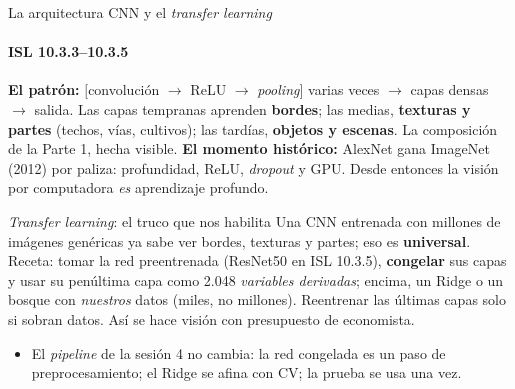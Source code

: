 \documentclass{beamer}
\newcommand{\1}{\mathbb{I}}
\begin{document}
\begin{frame}{La arquitectura CNN y el \emph{transfer learning}}
\framesubtitle{ISL 10.3.3--10.3.5}
\small
\textbf{El patrón:} $\big[$convolución $\rightarrow$ ReLU $\rightarrow$ \emph{pooling}$\big]$ varias veces $\rightarrow$ capas densas $\rightarrow$ salida. Las capas tempranas aprenden \textbf{bordes}; las medias, \textbf{texturas y partes} (techos, vías, cultivos); las tardías, \textbf{objetos y escenas}. La composición de la Parte 1, hecha visible.
\pause
\vspace{0.05cm}
\textbf{El momento histórico:} AlexNet gana ImageNet (2012) por paliza: profundidad, ReLU, \emph{dropout} y GPU. Desde entonces la visión por computadora \emph{es} aprendizaje profundo.
\pause
\vspace{0.05cm}
\begin{block}{\emph{Transfer learning}: el truco que nos habilita}
Una CNN entrenada con millones de imágenes genéricas ya sabe ver bordes, texturas y partes; eso es \textbf{universal}. Receta: tomar la red preentrenada (ResNet50 en ISL 10.3.5), \textbf{congelar} sus capas y usar su penúltima capa como 2.048 \emph{variables derivadas}; encima, un Ridge o un bosque con \emph{nuestros} datos (miles, no millones). Reentrenar las últimas capas solo si sobran datos. Así se hace visión con presupuesto de economista.
\end{block}
\pause
\begin{itemize}\itemsep2pt
  \item El \emph{pipeline} de la sesión 4 no cambia: la red congelada es un paso de preprocesamiento; el Ridge se afina con CV; la prueba se usa una vez.
\end{itemize}
\end{frame}
\end{document}
